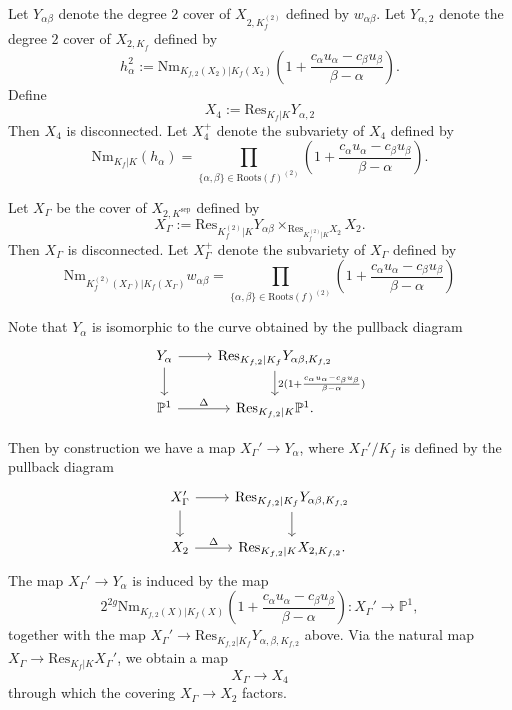 \documentclass[11pt]{amsart}
\theoremstyle{plain}
\theoremstyle{definition}
\newcommand{\Roots}{\mathrm{Roots}}
\newcommand{\sep}{\mathrm{sep}}
\newcommand{\Nm}{\mathrm{Nm}}
\newcommand{\Res}{\mathrm{Res}}
\begin{document}
Let $Y_{\alpha \beta }$ denote the degree $2$ cover of $X_{2,K_f ^{(2)}}$ defined by $w_{\alpha \beta }$. Let $Y_{\alpha ,2}$ denote the degree $2$ cover of $X_{2,K_f }$ defined by 
\[
h_{\alpha }^2 :=\Nm _{K_{f,2}(X_2 )|K_f (X_2 )} \left( 1+\frac{c_{\alpha }u_{\alpha }-c_{\beta }u_{\beta }}{\beta -\alpha } \right).
\]
Define
\[
X_4 :=\Res _{K_f |K}Y_{\alpha ,2}
\]
Then $X_4 $ is disconnected. Let $X_4 ^+ $ denote the subvariety of $X_4 $ defined by 
\[
\Nm _{K_f |K}(h_{\alpha })=\prod _{\{ \alpha ,\beta \} \in \Roots (f)^{(2)} }\left( 1+\frac{c_{\alpha }u_{\alpha }-c_{\beta }u_{\beta }}{\beta -\alpha } \right).
\]

Let $X_{\Gamma }$ be the cover of $X_{2,K^{\sep }}$ defined by 
\[
X_{\Gamma }:=\Res _{K_f ^{(2)}|K}Y_{\alpha \beta }\times _{\Res _{K_f ^{(2)}|K}X_2 }X_2 .
\]
Then $X_{\Gamma }$ is disconnected. Let $X_{\Gamma }^+$ denote the subvariety of $X_{\Gamma }$ defined by 
\[
\Nm _{K_f ^{(2)}(X_{\Gamma })|K_f (X_{\Gamma })}w_{\alpha \beta }=\prod _{\{\alpha ,\beta \} \in \Roots (f)^{(2)} }\left( 1+\frac{c_{\alpha }u_{\alpha }-c_{\beta }u_{\beta }}{\beta -\alpha } \right)
\]

Note that $Y_{\alpha }$ is isomorphic to the curve obtained by the pullback diagram
\begin{equation}
\begin{tikzcd}
Y_{\alpha } \arrow[d] \arrow[r] & \Res _{K_{f,2} |K_{f}}Y_{\alpha \beta ,K_{f,2}} \arrow[d, " 2( 1+\frac{c_{\alpha }u_{\alpha }-c_{\beta }u_{\beta }}{\beta -\alpha } ) " ] \\
\mathbb{P}^1 \arrow[r, " \Delta "] & \Res _{K_{f,2}|K}\mathbb{P}^1 .
\end{tikzcd}
\end{equation}

Then by construction we have a map $X_{\Gamma }' \to Y_{\alpha }$, where $X_{\Gamma }' /K_f$ is defined by the pullback diagram
\begin{equation}
\begin{tikzcd}
X_{\Gamma }' \arrow[d] \arrow[r] & \Res _{K_{f,2} |K_{f}}Y_{\alpha \beta ,K_{f,2}} \arrow[d] \\
X_2 \arrow[r, " \Delta "] & \Res _{K_{f,2}|K}X_{2,K_{f,2}} .
\end{tikzcd}
\end{equation}
The map $X_{\Gamma }' \to Y_{\alpha }$ is induced by the map 
\[
2^{2g}\Nm _{K_{f,2}(X)|K_f (X)}( 1+\frac{c_{\alpha }u_{\alpha }-c_{\beta }u_{\beta }}{\beta -\alpha } ): X_{\Gamma }' \to \mathbb{P}^1 ,
\] 
together with the map $X_{\Gamma }' \to \Res _{K_{f,2}|K_f }Y_{\alpha ,\beta ,K_{f,2}}$ above. Via the natural map $X_{\Gamma }\to \Res _{K_f |K}X_{\Gamma }'$, we obtain a map
\[
X_{\Gamma }\to X_4
\]
through which the covering $X_{\Gamma }\to X_2 $ factors.
\end{document}

